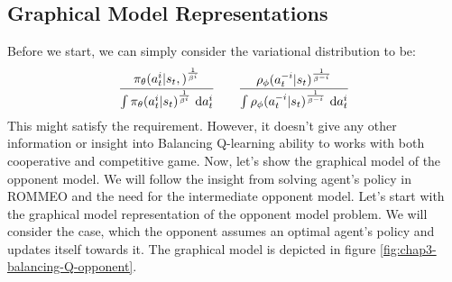 \label{sec:chap3-prob-balancing-q}

\subsection{Graphical Model Representations}
Before we start, we can simply consider the variational distribution to be:
\begin{equation}
    \cfrac{\pi_\theta(a^i_t | s_t,)^{\frac{1}{\beta^i}}}{\int  \pi_\theta(a^i_t | s_t)^{\frac{1}{\beta^i}}\ \mathrm{d} a^i_t} \qquad \frac{\rho_\phi(a^{-i}_t | s_t)^{\frac{1}{\beta^{-i}}}}{\int  \rho_\phi(a^{-i}_t | s_t)^{\frac{1}{\beta^{-i}}}\ \mathrm{d} a^i_t} 
\end{equation}
This might satisfy the requirement. However, it doesn't give any other information or insight into Balancing Q-learning ability to works with both cooperative and competitive game. Now, let's show the graphical model of the opponent model. We will follow the insight from solving agent's policy in ROMMEO and the need for the intermediate opponent model. Let's start with the graphical model representation of the opponent model problem. We will consider the case, which the opponent assumes an optimal agent's policy and updates itself towards it. The graphical model is depicted in figure \ref{fig:chap3-balancing-Q-opponent}.
